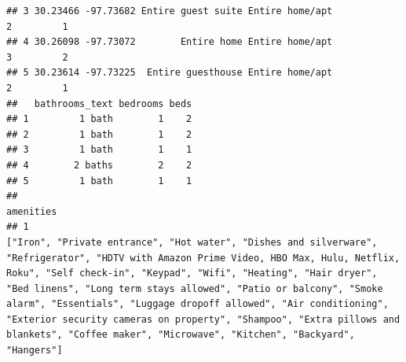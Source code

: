 \documentclass[
]{article}
\begin{document}
\begin{verbatim}
## 3 30.23466 -97.73682 Entire guest suite Entire home/apt            2         1
## 4 30.26098 -97.73072        Entire home Entire home/apt            3         2
## 5 30.23614 -97.73225  Entire guesthouse Entire home/apt            2         1
##   bathrooms_text bedrooms beds
## 1         1 bath        1    2
## 2         1 bath        1    2
## 3         1 bath        1    1
## 4        2 baths        2    2
## 5         1 bath        1    1
##                                                                                                                                                                                                                                                                                                                                                                                                                                                                                                                                                                                                                                                                                                                                                                                                                                                                                                                                                                                                                                                                                                                                                                                                                        amenities
## 1                                                                                                                                                                                                                                                                                                                                                                                                                                                                                                                                                                                                                                                                                                                         ["Iron", "Private entrance", "Hot water", "Dishes and silverware", "Refrigerator", "HDTV with Amazon Prime Video, HBO Max, Hulu, Netflix, Roku", "Self check-in", "Keypad", "Wifi", "Heating", "Hair dryer", "Bed linens", "Long term stays allowed", "Patio or balcony", "Smoke alarm", "Essentials", "Luggage dropoff allowed", "Air conditioning", "Exterior security cameras on property", "Shampoo", "Extra pillows and blankets", "Coffee maker", "Microwave", "Kitchen", "Backyard", "Hangers"]

\end{verbatim}
\end{document}
